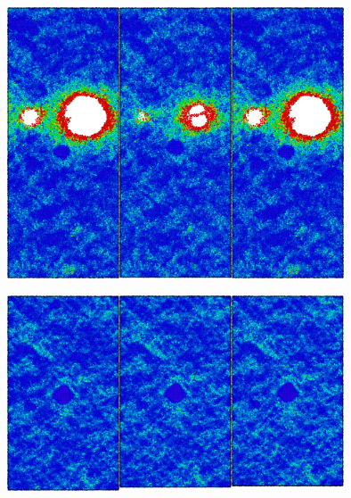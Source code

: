 \begin{figure}[htp]
\centering
\includegraphics[width=10cm]{../ResumenImagenes/Figures/NanoParticles/Snapshots/cuSphereTension_400K_Snapshots.png}
\caption[Inclusión de Cu-FCC bajo tracción a 400K]{}
\label{C4:fg:snapshot_ten_FCC_400K}
\end{figure}

\begin{figure}[htp]
\centering
\includegraphics[width=10cm]{../ResumenImagenes/Figures/NanoParticles/Snapshots/cuSphereCompression_10K_Snapshots.png}
\caption[Inclusión de Cu-FCC bajo compresión a 10K]{}
\label{C4:fg:snapshot_comp_FCC_10K}
\end{figure}

